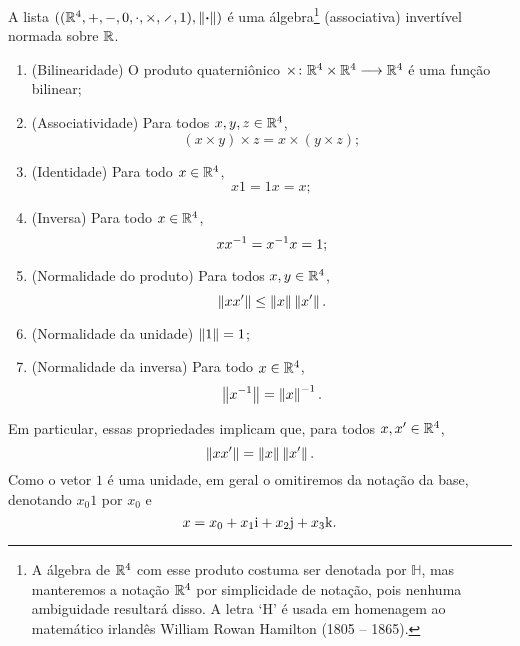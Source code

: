 \begin{proposition}
A lista $((\R^4,+,-,0,\cdot,\times,\div,1),\nor{\var})$ é uma álgebra\footnote{A álgebra de $\mathbb{R}^4$ com esse produto costuma ser denotada por $\mathbb{H}$, mas manteremos a notação $\mathbb{R}^4$ por simplicidade de notação, pois nenhuma ambiguidade resultará disso. A letra `H' é usada em homenagem ao matemático irlandês William Rowan Hamilton (1805 -- 1865).} (associativa) invertível normada sobre $\mathbb{R}$.
\begin{enumerate}
	\item (Bilinearidade) O produto quaterniônico ${\times}\colon {\mathbb{R}^4 \times \mathbb{R}^4} \longrightarrow {\mathbb{R}^4}$ é uma função bilinear;
	\item (Associatividade) Para todos $x,y,z \in \mathbb{R}^4$,
		\begin{equation*}
		(x \times y) \times z = x \times (y \times z);
		\end{equation*}
	\item (Identidade) Para todo $x \in \mathbb{R}^4$,
		\begin{equation*}
		x1 = 1x = x;
		\end{equation*}
	\item (Inversa) Para todo $x \in \mathbb{R}^4$,
		\begin{equation*}
		xx^{-1} = x^{-1} x = 1;
		\end{equation*}
	\item (Normalidade do produto) Para todos $x,y \in \mathbb{R}^4$,
		\begin{equation*}
		\left\Vert{xx'}\right\Vert \leq \left\Vert{x}\right\Vert\left\Vert{x'}\right\Vert.
		\end{equation*}
	\item (Normalidade da unidade) $\left\Vert{1}\right\Vert=1$;
	\item (Normalidade da inversa) Para todo $x \in \mathbb{R}^4$,
		\begin{equation*}
		\left\Vert{x^{-1}}\right\Vert = \left\Vert{x}\right\Vert^{-1}.
		\end{equation*}
\end{enumerate}
\end{proposition}

Em particular, essas propriedades implicam que, para todos $x,x' \in \mathbb{R}^4$,
	\begin{equation*}
	\left\Vert{xx'}\right\Vert = \left\Vert{x}\right\Vert\left\Vert{x'}\right\Vert.
	\end{equation*}
Como o vetor $1$ é uma unidade, em geral o omitiremos da notação da base, denotando $x_0 1$ por $x_0$ e
	\begin{equation*}
	x = x_0 + x_1 \mathrm{i} + x_2 \mathrm{j} + x_3 \mathrm{k}.
	\end{equation*}


